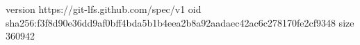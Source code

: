 version https://git-lfs.github.com/spec/v1
oid sha256:f3f8d90e36dd9af0bff4bda5b1b4eea2b8a92aadaec42ac6c278170fe2cf9348
size 360942
